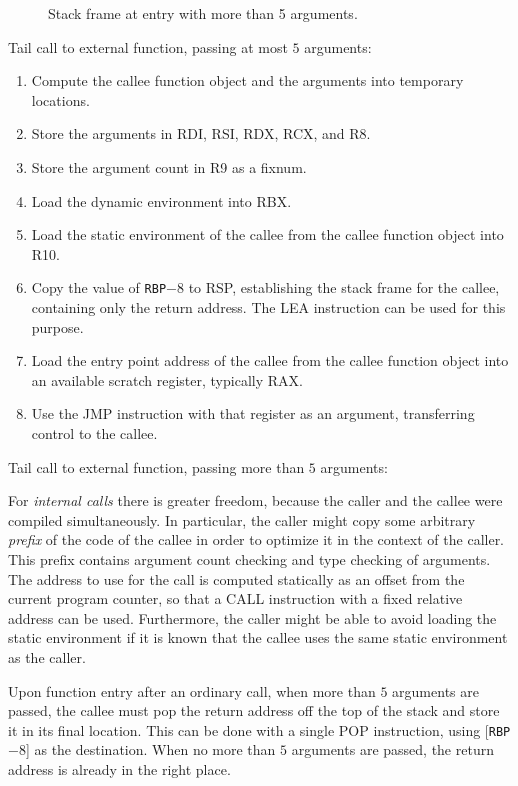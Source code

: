 \begin{figure}
\begin{center}
\end{center}
\caption{\label{fig-x86-64-stack-frame-at-entry}
Stack frame at entry with more than 5 arguments.}
\end{figure}

Tail call to external function, passing at most $5$ arguments:

\begin{enumerate}
\item Compute the callee function object and the arguments into
  temporary locations.
\item Store the arguments in RDI, RSI, RDX, RCX, and R8.
\item Store the argument count in R9 as a fixnum.
\item Load the dynamic environment into RBX.
\item Load the static environment of the callee from the callee
  function object into R10.
\item Copy the value of \texttt{RBP}$ - 8$ to RSP, establishing the stack frame
  for the callee, containing only the return address.  The LEA
  instruction can be used for this purpose.
\item Load the entry point address of the callee from the callee
  function object into an available scratch register, typically RAX.
\item Use the JMP instruction with that register as an argument,
  transferring control to the callee.
\end{enumerate}

Tail call to external function, passing more than $5$ arguments:%

For \emph{internal calls} there is greater freedom, because the caller
and the callee were compiled simultaneously.  In particular, the
caller might copy some arbitrary \emph{prefix} of the code of the
callee in order to optimize it in the context of the caller.  This
prefix contains argument count checking and type checking of
arguments.  The address to use for the call is computed statically as
an offset from the current program counter, so that a CALL instruction
with a fixed relative address can be used.  Furthermore, the caller
might be able to avoid loading the static environment if it is known
that the callee uses the same static environment as the caller.

Upon function entry after an ordinary call, when more than $5$
arguments are passed, the callee must pop the return address off the
top of the stack and store it in its final location.  This can be done
with a single POP instruction, using [\texttt{RBP}$ - 8$] as the
destination.  When no more than $5$ arguments are passed, the return
address is already in the right place.

